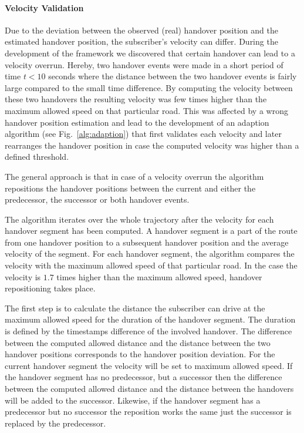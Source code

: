 \paragraph{Velocity Validation}
Due to the deviation between the observed (real) handover position and the estimated handover position, the subscriber's velocity can differ. During the development of the framework we discovered that certain handover can lead to a velocity overrun. Hereby, two handover events were made in a short period of time $t<10$ seconds where the distance between the two handover events is fairly large compared to the small time difference. By computing the velocity between these two handovers the resulting velocity was few times higher than the maximum allowed speed on that particular road. This was affected by a wrong handover position estimation and lead to the development of an adaption algorithm (see Fig.~\ref{alg:adaption}) that first validates each velocity and later rearranges the handover position in case the computed velocity was higher than a defined threshold. 

The general approach is that in case of a velocity overrun the algorithm repositions the handover positions between the current and either the predecessor, the successor or both handover events.

The algorithm iterates over the whole trajectory after the velocity for each handover segment has been computed. A handover segment is a part of the route from one handover position to a subsequent handover position and the average velocity of the segment. For each handover segment, the algorithm compares the velocity with the maximum allowed speed of that particular road. In the case the velocity is $1.7$ times higher than the maximum allowed speed, handover repositioning takes place. 

The first step is to calculate the distance the subscriber can drive at the maximum allowed speed for the duration of the handover segment. The duration is defined by the timestamps difference of the involved handover. The difference between the computed allowed distance and the distance between the two handover positions corresponds to the handover position deviation. For the current handover segment the velocity will be set to maximum allowed speed. If the handover segment has no predecessor, but a successor then the difference between the computed allowed distance and the distance between the handovers will be added to the successor. Likewise, if the handover segment has a predecessor but no successor the reposition works the same just the successor is replaced by the predecessor. 

